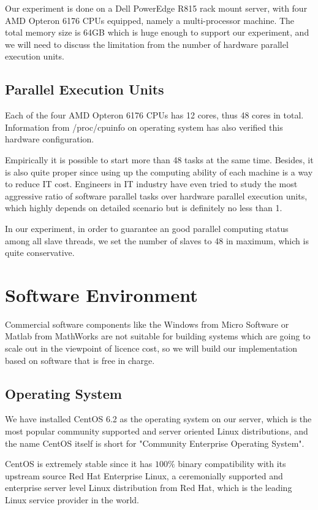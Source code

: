 \documentclass[12pt,a4]{report}
\begin{document}
Our experiment is done on a Dell PowerEdge R815 rack mount server, with four AMD Opteron 6176 CPUs equipped, namely a multi-processor machine. The total memory size is 64GB which is huge enough to support our experiment, and we will need to discuss the limitation from the number of hardware parallel execution units.

\subsection{Parallel Execution Units}

Each of the four AMD Opteron 6176 CPUs has 12 cores, thus 48 cores in total. Information from /proc/cpuinfo on operating system has also verified this hardware configuration.

Empirically it is possible to start more than 48 tasks at the same time. Besides, it is also quite proper since using up the computing ability of each machine is a way to reduce IT cost. Engineers in IT industry have even tried to study the most aggressive ratio of software parallel tasks over hardware parallel execution units, which highly depends on detailed scenario but is definitely no less than 1.

In our experiment, in order to guarantee an good parallel computing status among all slave threads, we set the number of slaves to 48 in maximum, which is quite conservative.

\section{Software Environment}

Commercial software components like the Windows from Micro Software or Matlab from MathWorks are not suitable for building systems which are going to scale out in the viewpoint of licence cost, so we will build our implementation based on software that is free in charge.

\subsection{Operating System}

We have installed CentOS 6.2 as the operating system on our server, which is the most popular community supported and server oriented Linux distributions, and the name CentOS itself is short for "Community Enterprise Operating System".

CentOS is extremely stable since it has $100\%$ binary compatibility with its upstream source Red Hat Enterprise Linux, a ceremonially supported and enterprise server level Linux distribution from Red Hat, which is the leading Linux service provider in the world. 
\end{document}
